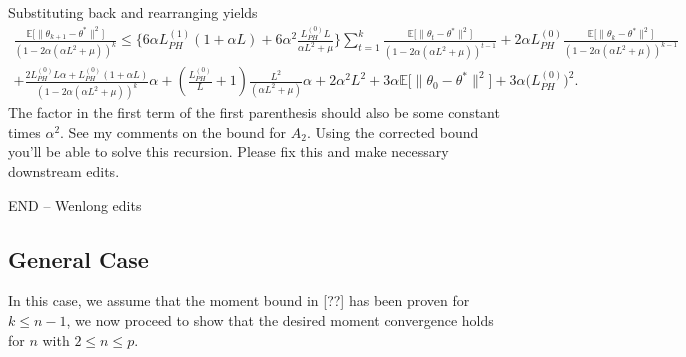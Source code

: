 \documentclass[a4paper]{article}
\newcommand{\norm}[1]{\|#1 \|}
\newcommand{\Exs}{\mathbb{E}}
\newcommand{\thetastar}{\theta^*}
\newcommand{\constLPH}[1]{L_{PH}^{(#1)}}
\newcommand{\mwlcomment}[1]{{\color{orange} #1}}
\newcommand{\stepsize}{\alpha}
\begin{document}
Substituting back and rearranging yields
\begin{multline*}
	\frac{\Exs \big[ \norm{\theta_{k + 1} - \thetastar}^2 \big]}{(1 - 2 \stepsize (\stepsize L^2 + \mu))^k} \leq  \Big\{ 6 \stepsize \constLPH{1} (1 + \stepsize L) +  6 \stepsize^2 \frac{\constLPH{0} L}{\alpha L^{2} + \mu}  \Big\} \sum_{t = 1}^k \frac{\Exs \big[ \norm{\theta_{t} - \thetastar}^2 \big]}{(1 - 2 \stepsize (\stepsize L^2 + \mu))^{t - 1}} + 2 \stepsize \constLPH{0} \frac{\Exs \big[ \norm{\theta_k - \thetastar}^2 \big]}{(1 - 2 \stepsize (\stepsize L^2 + \mu))^{k - 1}} \\
	 +\frac{2 \constLPH{0} L \stepsize + \constLPH{0} (1 + \stepsize L) }{(1 - 2 \stepsize (\stepsize L^2 + \mu))^k} \stepsize +  \left(\frac{L_{PH}^{(0)}}{L} + 1\right)\frac{L^{2}}{\left(\alpha L^{2} + \mu\right)} \stepsize + 2 \stepsize^2 L^2 + 3 \stepsize \Exs \big[ \norm{\theta_0 - \thetastar}^2 \big] + 3\stepsize \big(\constLPH{0} \big)^2.
\end{multline*}
\mwlcomment{The factor in the first term of the first parenthesis should also be some constant times $\stepsize^2$. See my comments on the bound for $A_2$. Using the corrected bound you'll be able to solve this recursion. Please fix this and make necessary downstream edits.}







\mwlcomment{END -- Wenlong edits}


\subsection{General Case}
In this case, we assume that the moment bound in [??] has been proven for $k \le n - 1$, we now proceed to show that the desired moment convergence holds for $n$ with $2 \le n \le p$.
\end{document}
